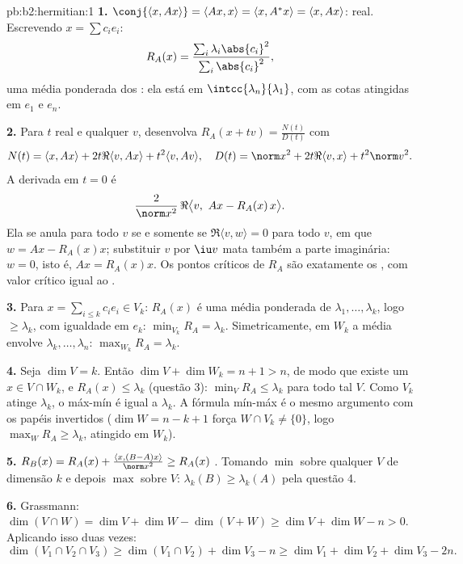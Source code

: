 \begin{solution}{pb:b2:hermitian:1}
\textbf{1.} $\conj{\langle x, Ax\rangle} = \langle Ax, x\rangle
= \langle x, A^*x\rangle = \langle x, Ax\rangle$: real. Escrevendo
$x = \sum c_ie_i$:
\[
R_A(x) = \frac{\sum_i\lambda_i\abs{c_i}^2}
{\sum_i\abs{c_i}^2} ,
\]
uma média ponderada dos : ela está em
$\intcc{\lambda_n}{\lambda_1}$, com as cotas atingidas em
$e_1$ e $e_n$.

\textbf{2.} Para $t$ real e qualquer $v$, desenvolva $R_A(x + tv) =
\frac{N(t)}{D(t)}$ com
\[
N(t) = \langle x, Ax\rangle + 2t\Re\langle v, Ax\rangle +
t^2\langle v, Av\rangle,
\quad
D(t) = \norm x^2 + 2t\Re\langle v, x\rangle + t^2\norm v^2 .
\]
A derivada em $t = 0$ é
\[
\frac{2}{\norm x^2}\,
\Re\bigl\langle v,\ Ax - R_A(x)\,x\bigr\rangle .
\]
Ela se anula para todo $v$ se e somente se $\Re\langle v, w\rangle = 0$ para
todo $v$, em que $w = Ax - R_A(x)x$; substituir $v$ por $\iu v$
mata também a parte imaginária: $w = 0$, isto é, $Ax = R_A(x)x$.
Os pontos críticos de $R_A$ são exatamente os , com
valor crítico igual ao .

\textbf{3.} Para $x = \sum_{i\leq k}c_ie_i \in V_k$: $R_A(x)$ é
uma média ponderada de $\lambda_1, \dots, \lambda_k$, logo
$\geq \lambda_k$, com igualdade em $e_k$: $\min_{V_k} R_A =
\lambda_k$. Simetricamente, em $W_k$ a média envolve
$\lambda_k, \dots, \lambda_n$: $\max_{W_k}R_A = \lambda_k$.

\textbf{4.} Seja $\dim V = k$. Então $\dim V + \dim W_k = n + 1 >
n$, de modo que existe um  $x \in V \cap W_k$, e $R_A(x) \leq
\lambda_k$ (questão 3): $\min_{V}R_A \leq \lambda_k$ para todo
tal $V$. Como $V_k$ atinge $\lambda_k$, o máx-mín é igual a
$\lambda_k$. A fórmula mín-máx é o mesmo argumento com os
papéis invertidos ($\dim W = n - k + 1$ força $W \cap V_k \neq
\{0\}$, logo $\max_W R_A \geq \lambda_k$, atingido em $W_k$).

\textbf{5.} $R_B(x) = R_A(x) + \frac{\langle x,
(B-A)x\rangle}{\norm x^2} \geq R_A(x)$ . Tomando
$\min$ sobre qualquer $V$ de dimensão $k$ e depois $\max$ sobre $V$:
$\lambda_k(B) \geq \lambda_k(A)$ pela questão 4.

\textbf{6.} Grassmann: $\dim(V\cap W) = \dim V + \dim W -
\dim(V + W) \geq \dim V + \dim W - n > 0$. Aplicando isso duas vezes:
\[
\dim(V_1\cap V_2\cap V_3)
\geq \dim(V_1\cap V_2) + \dim V_3 - n
\geq \dim V_1 + \dim V_2 + \dim V_3 - 2n .
\]


\end{solution}
